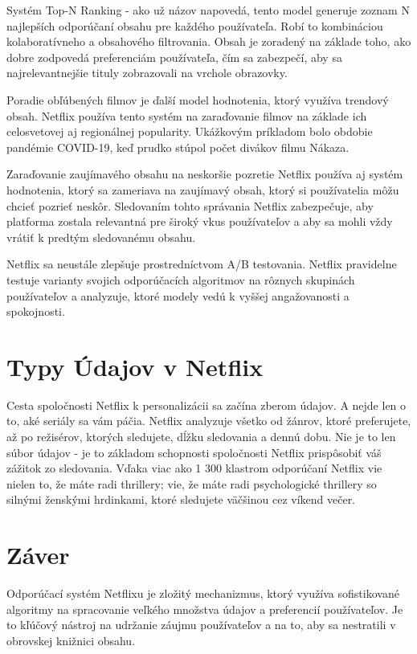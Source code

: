 \documentclass[10pt,slovak,a4paper]{article}
\begin{document}
Systém Top-N Ranking - ako už názov napovedá, tento model generuje zoznam N najlepších odporúčaní obsahu pre každého používateľa. Robí to kombináciou kolaboratívneho a obsahového filtrovania. Obsah je zoradený na základe toho, ako dobre zodpovedá preferenciám používateľa, čím sa zabezpečí, aby sa najrelevantnejšie tituly zobrazovali na vrchole obrazovky.\cite{Top}


Poradie obľúbených filmov je ďalší model hodnotenia, ktorý využíva trendový obsah. Netflix používa tento systém na zaraďovanie filmov na základe ich celosvetovej aj regionálnej popularity. Ukážkovým príkladom bolo obdobie pandémie COVID-19, keď prudko stúpol počet divákov filmu Nákaza.\cite{Top} 


Zaraďovanie zaujímavého obsahu na neskoršie pozretie
Netflix používa aj systém hodnotenia, ktorý sa zameriava na zaujímavý obsah, ktorý si používatelia môžu chcieť pozrieť neskôr. Sledovaním tohto správania Netflix zabezpečuje, aby platforma zostala relevantná pre široký vkus používateľov a aby sa mohli vždy vrátiť k predtým sledovanému obsahu.\cite{Top}\cite{Ranking:System}


Netflix sa neustále zlepšuje prostredníctvom A/B testovania. Netflix pravidelne testuje varianty svojich odporúčacích algoritmov na rôznych skupinách používateľov a analyzuje, ktoré modely vedú k vyššej angažovanosti a spokojnosti.\cite{Ranking:System}

\section{Typy Údajov v Netflix}
Cesta spoločnosti Netflix k personalizácii sa začína zberom údajov. A nejde len o to, aké seriály sa vám páčia. Netflix analyzuje všetko od žánrov, ktoré preferujete, až po režisérov, ktorých sledujete, dĺžku sledovania a dennú dobu. Nie je to len súbor údajov - je to základom schopnosti spoločnosti Netflix prispôsobiť váš zážitok zo sledovania. Vďaka viac ako 1 300 klastrom odporúčaní Netflix vie nielen to, že máte radi thrillery; vie, že máte radi psychologické thrillery so silnými ženskými hrdinkami, ktoré sledujete väčšinou cez víkend večer.\cite{Bennett}\cite{Data}

\section{Záver}
Odporúčací systém Netflixu je zložitý mechanizmus, ktorý využíva sofistikované algoritmy na spracovanie veľkého množstva údajov a preferencií používateľov. Je to kľúčový nástroj na udržanie záujmu používateľov a na to, aby sa nestratili v obrovskej knižnici obsahu.



\end{document}
